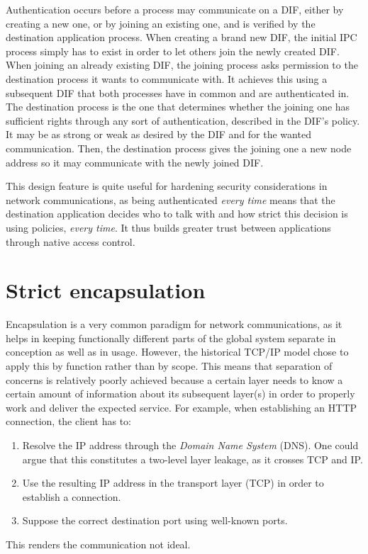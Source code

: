 \documentclass[a4paper]{proc}
\begin{document}
Authentication occurs before a process may communicate on a DIF, either by
creating a new one, or by joining an existing one, and is verified by the
destination application process. When creating a brand new DIF, the initial IPC
process simply has to exist in order to let others join the newly created DIF\@.
When joining an already existing DIF, the joining process asks permission to the
destination process it wants to communicate with. It achieves this using a
subsequent DIF that both processes have in common and are authenticated in.  The
destination process is the one that determines whether the joining one has
sufficient rights through any sort of authentication, described in the DIF's
policy. It may be as strong or weak as desired by the DIF and for the wanted
communication. Then, the destination process gives the joining one a new node
address so it may communicate with the newly joined DIF.

This design feature is quite useful for hardening security considerations in
network communications, as being authenticated \textit{every time} means that
the destination application decides who to talk with and how strict this
decision is using policies, \textit{every time}. It thus builds greater trust
between applications through native access control.

\section{Strict encapsulation}

Encapsulation is a very common paradigm for network communications, as it helps
in keeping functionally different parts of the global system separate in
conception as well as in usage. However, the historical TCP/IP model chose to
apply this by function rather than by scope. This means that separation of
concerns is relatively poorly achieved because a certain layer needs to know a
certain amount of information about its subsequent layer(s) in order to properly
work and deliver the expected service. For example, when establishing an HTTP
connection, the client has to:
\begin{enumerate}
    \item Resolve the IP address through the \textit{Domain Name System} (DNS).
        One could argue that this constitutes a two-level layer leakage, as it
        crosses TCP and IP.
    \item Use the resulting IP address in the transport layer (TCP) in order to
        establish a connection.
    \item Suppose the correct destination port using well-known ports.
\end{enumerate}
This renders the communication not ideal.
\end{document}
